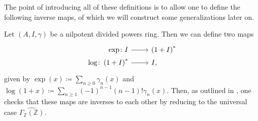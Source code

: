 \documentclass[../Main]{subfiles}
\begin{document}
\noindent
The point of introducing all of these definitions is to allow one to define the following
inverse maps, of which we will construct some generalizations later on.
\begin{defn}[]
	Let $\left(A, I, \gamma\right)$ be a nilpotent divided powers ring.
	Then we can define two maps
	\begin{equation*}
	\begin{tikzcd}[row sep = 0ex
		,/tikz/column 1/.append style={anchor=base east}
		,/tikz/column 2/.append style={anchor=base west}]
		\exp\colon I \arrow[r, "", rightarrow] &
		\left( 1 + I \right)^*\\
		\log\colon \left( 1 + I \right)^* \arrow[r, "", rightarrow] &
		I
	,\end{tikzcd}
	\end{equation*} 
	given by 
	$\exp (x) \coloneqq \sum_{n\geq 0} \gamma_n(x)$
	and $\log (1+x) \coloneqq \sum_{n\geq 1} 
	(-1)^{n-1} \left( n-1 \right)! \gamma_n(x)$.
	Then, as outlined in \cite[Chapter III, \S1.6]{Messing},
	one checks that these maps are inverses to each other
	by reducing to the universal case $\widehat{\Gamma_{\mathbb{Z}}(\mathbb{Z})}$.
\end{defn}
\end{document}
